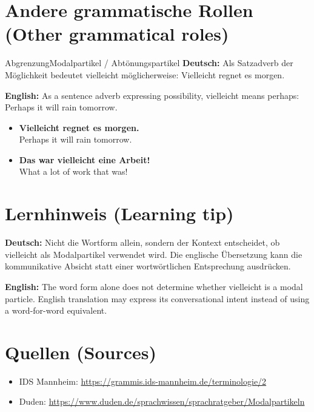 \documentclass[a4paper,11pt]{article}
\newcommand{\GermanText}[1]{\textbf{Deutsch: }#1\par}
\newcommand{\EnglishText}[1]{{\small\color{SoftGray}\textbf{English: }#1\par}}
\newcommand{\ExampleItem}[2]{\item \textbf{#1}\\{\small\color{SoftGray}#2}}
\begin{document}
\section{Andere grammatische Rollen \textnormal{(Other grammatical roles)}}
\begin{grammarentry}{Abgrenzung}{Modalpartikel / Abtönungspartikel}
\GermanText{Als Satzadverb der Möglichkeit bedeutet vielleicht möglicherweise: Vielleicht regnet es morgen.}
\EnglishText{As a sentence adverb expressing possibility, vielleicht means perhaps: Perhaps it will rain tomorrow.}
\end{grammarentry}
\begin{exbox}\begin{itemize}
\ExampleItem{Vielleicht regnet es morgen.}{Perhaps it will rain tomorrow.}
\ExampleItem{Das war vielleicht eine Arbeit!}{What a lot of work that was!}
\end{itemize}\end{exbox}
\section{Lernhinweis \textnormal{(Learning tip)}}
\GermanText{Nicht die Wortform allein, sondern der Kontext entscheidet, ob vielleicht als Modalpartikel verwendet wird. Die englische Übersetzung kann die kommunikative Absicht statt einer wortwörtlichen Entsprechung ausdrücken.}
\EnglishText{The word form alone does not determine whether vielleicht is a modal particle. English translation may express its conversational intent instead of using a word-for-word equivalent.}
\section{Quellen \textnormal{(Sources)}}
\begin{itemize}
\item IDS Mannheim: \url{https://grammis.ids-mannheim.de/terminologie/2}
\item Duden: \url{https://www.duden.de/sprachwissen/sprachratgeber/Modalpartikeln}
\end{itemize}
\end{document}
